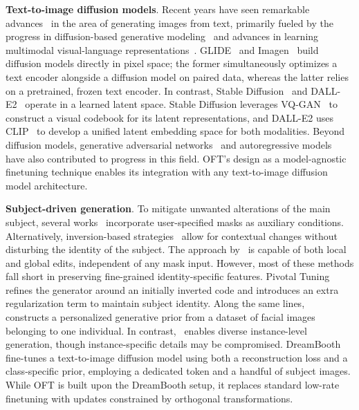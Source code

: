 \textbf{Text-to-image diffusion models}. Recent years have seen remarkable advances~\cite{saharia2022photorealistic,ramesh2022hierarchical,rombach2022high,gu2022vector,nichol2022glide} in the area of generating images from text, primarily fueled by the progress in diffusion-based generative modeling~\cite{ho2020denoising,song2021score,song2021denoising,dhariwal2021diffusion} and advances in learning multimodal visual-language representations~\cite{su2020vlbert,lu2019vilbert,radford2021learning,wang2021simvlm,li2022blip,li2023blip,alayrac2022flamingo,schuhmann2022laion}. GLIDE~\cite{nichol2022glide} and Imagen~\cite{saharia2022photorealistic} build diffusion models directly in pixel space; the former simultaneously optimizes a text encoder alongside a diffusion model on paired data, whereas the latter relies on a pretrained, frozen text encoder. In contrast, Stable Diffusion~\cite{rombach2022high} and DALL-E2~\cite{ramesh2022hierarchical} operate in a learned latent space. Stable Diffusion leverages VQ-GAN~\cite{esser2021taming} to construct a visual codebook for its latent representations, and DALL-E2 uses CLIP~\cite{radford2021learning} to develop a unified latent embedding space for both modalities. Beyond diffusion models, generative adversarial networks~\cite{reed2016generative,zhang2017stackgan,xu2018attngan,li2019controllable} and autoregressive models~\cite{ramesh2021zero,ding2021cogview,wu2022nuwa,yuscaling} have also contributed to progress in this field. OFT’s design as a model-agnostic finetuning technique enables its integration with any text-to-image diffusion model architecture.

\textbf{Subject-driven generation}. To mitigate unwanted alterations of the main subject, several works~\cite{avrahami2022blended,nichol2022glide} incorporate user-specified masks as auxiliary conditions. Alternatively, inversion-based strategies~\cite{choi2021ilvr,dhariwal2021diffusion,ramesh2022hierarchical,gal2022image} allow for contextual changes without disturbing the identity of the subject. The approach by~\cite{hertz2022prompt} is capable of both local and global edits, independent of any mask input. However, most of these methods fall short in preserving fine-grained identity-specific features. Pivotal Tuning~\cite{roich2022pivotal} refines the generator around an initially inverted code and introduces an extra regularization term to maintain subject identity. Along the same lines,~\cite{nitzan2022mystyle} constructs a personalized generative prior from a dataset of facial images belonging to one individual. In contrast,~\cite{casanova2021instance} enables diverse instance-level generation, though instance-specific details may be compromised. DreamBooth~\cite{ruiz2023dreambooth} fine-tunes a text-to-image diffusion model using both a reconstruction loss and a class-specific prior, employing a dedicated token and a handful of subject images. While OFT is built upon the DreamBooth setup, it replaces standard low-rate finetuning with updates constrained by orthogonal transformations.

